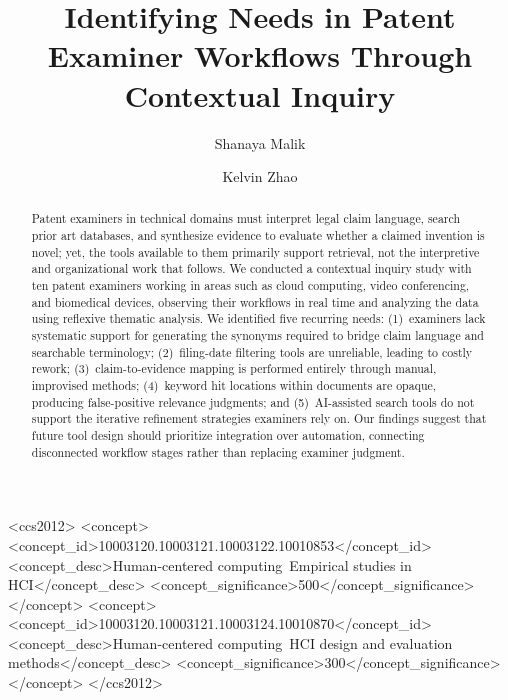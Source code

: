 \documentclass[sigconf]{acmart}
\begin{document}
\title{Identifying Needs in Patent Examiner Workflows Through Contextual Inquiry}

\author{Shanaya Malik}

\author{Kelvin Zhao}

\renewcommand{\shortauthors}{Malik \& Zhao}

\begin{abstract}
Patent examiners in technical domains must interpret legal claim language, search prior art databases, and synthesize evidence to evaluate whether a claimed invention is novel; yet, the tools available to them primarily support retrieval, not the interpretive and organizational work that follows. We conducted a contextual inquiry study with ten patent examiners working in areas such as cloud computing, video conferencing, and biomedical devices, observing their workflows in real time and analyzing the data using reflexive thematic analysis. We identified five recurring needs: (1)~examiners lack systematic support for generating the synonyms required to bridge claim language and searchable terminology; (2)~filing-date filtering tools are unreliable, leading to costly rework; (3)~claim-to-evidence mapping is performed entirely through manual, improvised methods; (4)~keyword hit locations within documents are opaque, producing false-positive relevance judgments; and (5)~AI-assisted search tools do not support the iterative refinement strategies examiners rely on. Our findings suggest that future tool design should prioritize integration over automation, connecting disconnected workflow stages rather than replacing examiner judgment.
\end{abstract}

\begin{CCSXML}
<ccs2012>
 <concept>
  <concept_id>10003120.10003121.10003122.10010853</concept_id>
  <concept_desc>Human-centered computing~Empirical studies in HCI</concept_desc>
  <concept_significance>500</concept_significance>
 </concept>
 <concept>
  <concept_id>10003120.10003121.10003124.10010870</concept_id>
  <concept_desc>Human-centered computing~HCI design and evaluation methods</concept_desc>
  <concept_significance>300</concept_significance>
 </concept>
</ccs2012>
\end{CCSXML}
\end{document}

